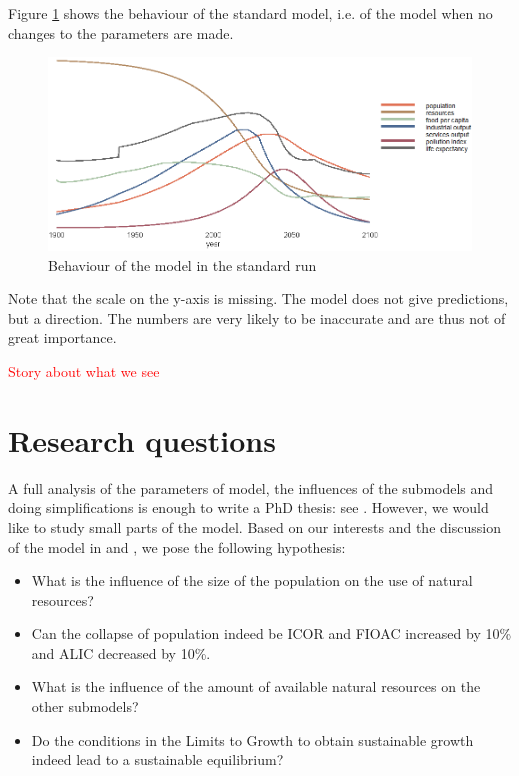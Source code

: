 \documentclass[10pt,a4paper]{scrartcl}
\begin{document}
Figure \ref{standard-run} shows the behaviour of the standard model, i.e. of the model when no changes to the parameters are made.

\begin{figure}
\centering
\includegraphics[width=\textwidth]{./plaatjes/standard-run.png}
\caption{Behaviour of the model in the standard run}
\label{standard-run}
\end{figure}

Note that the scale on the y-axis is missing. The model does not give predictions, but a direction. The numbers are very likely to be inaccurate and are thus not of great importance.

\textcolor{red}{Story about what we see}

\section*{Research questions}

A full analysis of the parameters of model, the influences of the submodels and doing simplifications is enough to write a PhD thesis: see \cite{thissen1978investigations}. However, we would like to study small parts of the model. Based on our interests and the discussion of the model in \cite{thissen1978investigations} and \cite{vermeulen1976parameter}, we pose the following hypothesis:

\begin{itemize}
	\item What is the influence of the size of the population on the use of natural resources?
	\item Can the collapse of population indeed be ICOR and FIOAC increased by 10\% and ALIC decreased by 10\%.
	\item What is the influence of the amount of available natural resources on the other submodels?
	\item Do the conditions in the Limits to Growth to obtain sustainable growth indeed lead to a sustainable equilibrium?
\end{itemize}
\end{document}
